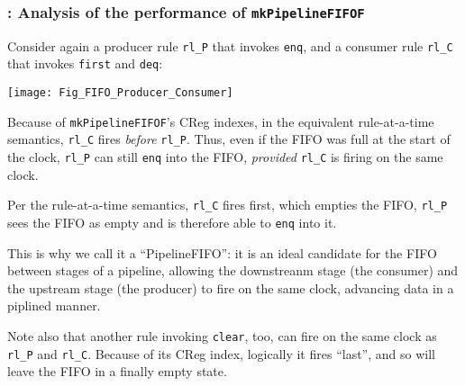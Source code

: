 
\begin{frame}[fragile]
\frametitle{{\BSV}: Analysis of the performance of {\tt mkPipelineFIFOF}}

\footnotesize

\begin{minipage}{0.45\textwidth}
  Consider again a producer rule \verb|rl_P| that invokes \verb|enq|, and a
  consumer rule \verb|rl_C| that invokes \verb|first| and \verb|deq|:
\end{minipage}
\hm
\begin{minipage}{0.5\textwidth}
  \texttt{[image: Fig\_FIFO\_Producer\_Consumer]}
\end{minipage}

\vspace{5ex}

Because of {\tt mkPipelineFIFOF}'s CReg indexes, in the equivalent
rule-at-a-time semantics, \verb|rl_C| fires \emph{before} \verb|rl_P|.
Thus, even if the FIFO was full at the start of the clock, \verb|rl_P|
can still \verb|enq| into the FIFO, \emph{provided} \verb|rl_C| is
firing on the same clock.

\vspace{1ex}

Per the rule-at-a-time semantics,
\verb|rl_C| fires first, which empties the FIFO, {\ie} \verb|rl_P|
sees the FIFO as empty and is therefore able to \verb|enq| into it.

\vspace{1ex}

This is why we call it a ``PipelineFIFO'': it is an ideal candidate
for the FIFO between stages of a pipeline, allowing the downstreanm
stage (the consumer) and the upstream stage (the producer) to fire on
the same clock, advancing data in a piplined manner.

\vspace{2ex}

Note also that another rule invoking \verb|clear|, too, can fire on
the same clock as \verb|rl_P| and \verb|rl_C|.  Because of its CReg
index, logically it fires ``last'', and so will leave the FIFO in a
finally empty state.

\end{frame}


